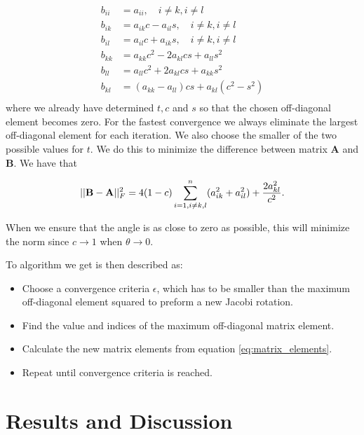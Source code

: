 \documentclass[11pt, a4paper]{article}
\begin{document}
\begin{equation}
\begin{aligned}
b_{ii} &= a_{ii},\quad i \neq k, i \neq l\\
b_{ik} &= a_{ik}c - a_{il}s,\quad i \neq k, i \neq l\\
b_{il} &= a_{il}c + a_{ik}s,\quad i \neq k, i \neq l\\
b_{kk} &= a_{kk}c^2 - 2a_{kl}cs+ a_{ll}s^2\\
b_{ll} &= a_{ll}c^2+ 2a_{kl}cs+a_{kk}s^2\\
b_{kl} &= (a_{kk} - a_{ll})cs+ a_{kl}(c^2-s^2)\\
\end{aligned}
\label{eq:matrix_elements}
\end{equation}
where we already have determined $t,c$ and $s$ so that the chosen off-diagonal element becomes zero. For the fastest convergence we always eliminate the largest off-diagonal element for each iteration. We also choose the smaller of the two possible values for $t$. We do this to minimize the difference between matrix $\mathbf{A}$ and $\mathbf{B}$. We have that

\begin{gather}
||{\bf B}-{\bf A}||_F^2=4(1-c)\sum_{i=1,i\ne k,l}^n(a_{ik}^2+a_{il}^2) +\frac{2a_{kl}^2}{c^2}.
\end{gather}

When we ensure that the angle is as close to zero as possible, this will minimize the norm since $c\rightarrow 1$ when $\theta \rightarrow 0$.

To algorithm we get is then described as:
\begin{itemize}
\item Choose a convergence criteria $\epsilon$, which has to be smaller than the maximum off-diagonal element squared to preform a new Jacobi rotation.
\item Find the value and indices of the maximum off-diagonal matrix element.
\item Calculate the new matrix elements from equation \eqref{eq:matrix_elements}. 
\item Repeat until convergence criteria is reached.
\end{itemize} 
\clearpage

\section{Results and Discussion}
\end{document}
